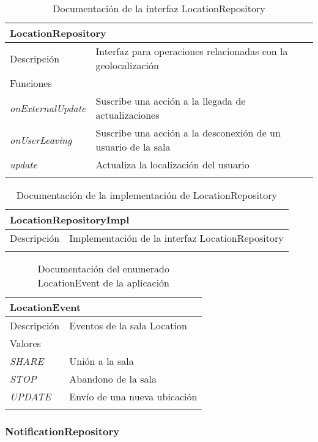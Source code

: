 \begin{longtable}{|p{} p{}|}
    \hline
    \multicolumn{2}{|l|}{\textbf{LocationRepository}} \\ \hline \hline
    Descripción      & Interfaz para operaciones relacionadas con la geolocalización \\ \hline
    \multicolumn{2}{|l|}{Funciones} \\
    \emph{onExternalUpdate}  & Suscribe una acción a la llegada de actualizaciones \\
    \emph{onUserLeaving}  & Suscribe una acción a la desconexión de un usuario de la sala \\
    \emph{update}  & Actualiza la localización del usuario \\ \hline
    \caption{Documentación de la interfaz LocationRepository}
    \label{dis:app:location_repository}
\end{longtable}

\begin{longtable}{|p{} p{}|}
    \hline
    \multicolumn{2}{|l|}{\textbf{LocationRepositoryImpl}} \\ \hline \hline
    Descripción      & Implementación de la interfaz LocationRepository \\ \hline
    \caption{Documentación de la implementación de LocationRepository}
    \label{dis:app:location_repository_impl}
\end{longtable}

\vspace{-20pt}
\begin{longtable}{|p{} p{}|}
    \hline
    \multicolumn{2}{|l|}{\textbf{LocationEvent}} \\ \hline \hline
    Descripción      & Eventos de la sala Location \\ \hline
    \multicolumn{2}{|l|}{Valores} \\
    \emph{SHARE}  & Unión a la sala  \\
    \emph{STOP} & Abandono de la sala  \\
    \emph{UPDATE} & Envío de una nueva ubicación  \\ \hline
    \caption{Documentación del enumerado LocationEvent de la aplicación}
    \label{dis:app:location_event}
\end{longtable}

\subsubsection{NotificationRepository}

